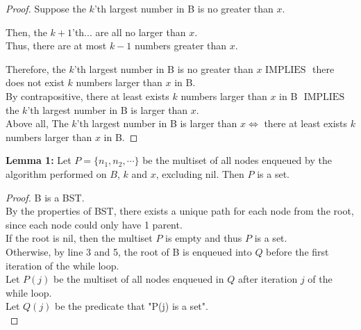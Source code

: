 \documentclass[10pt]{article}
\newcommand{\iimplies}{\mbox{ IMPLIES }}
\begin{document}
\begin{enumerate}
\begin{addmargin}[1em]{0em}
\begin{proof}
        Suppose the $k$'th largest number in B is no greater than $x$.
        \begin{addmargin}[1em]{0em}
            Then, the $k+1$'th... are all no larger than $x$. \\
            Thus, there are at most $k-1$ numbers greater than $x$.
        \end{addmargin}
        Therefore, the $k$'th largest number in B is no greater than $x \iimplies$ there does not exist $k$ numbers larger than $x$ in B. \\
        By contrapositive, there at least exists $k$ numbers larger than $x$ in B $\iimplies$ the $k$'th largest number in B is larger than $x$. \\

        Above all, The $k$'th largest number in B is larger than $x \iff$ there at least exists $k$ numbers larger than $x$ in B. 
    \end{proof}
\end{addmargin}

\begin{addmargin}[1em]{0em}
    \textbf{Lemma 1:} Let $P=\{n_1,n_2, \cdots\}$ be the multiset of all nodes enqueued by the algorithm performed on $B$, $k$ and $x$, excluding nil.
    Then $P$ is a set.
    \begin{proof}
        B is a BST. \\
        By the properties of BST, there exists a unique path for each node from the root, since each node could only have 1 parent. \\
        If the root is nil, then the multiset $P$ is empty and thus $P$ is a set. \\
        Otherwise, by line 3 and 5, the root of B is enqueued into $Q$ before the first iteration of the while loop. \\
        Let $P(j)$ be the multiset of all nodes enqueued in $Q$ after iteration $j$ of the while loop. \\
        Let $Q(j)$ be the predicate that "P(j) is a set". \\


\end{proof}
\end{addmargin}
\end{enumerate}
\end{document}
